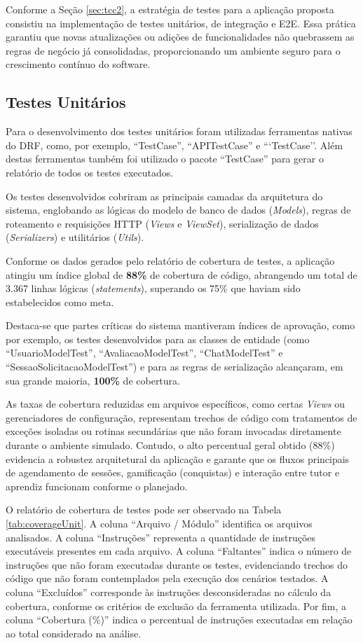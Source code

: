 Conforme a Seção \ref{sec:tcc2}, a estratégia de testes para a aplicação proposta consistiu na implementação de testes unitários, de integração e E2E. Essa prática garantiu que novas atualizações ou adições de funcionalidades não quebrassem as regras de negócio já consolidadas, proporcionando um ambiente seguro para o crescimento contínuo do software.

\subsection[Testes Unitários]{Testes Unitários}

Para o desenvolvimento dos testes unitários foram utilizadas ferramentas nativas do DRF, como, por exemplo, ``TestCase'', ``APITestCase'' e ```TestCase''. Além destas ferramentas também foi utilizado o pacote ``TestCase'' para gerar o relatório de todos os testes executados.

Os testes desenvolvidos cobriram as principais camadas da arquitetura do sistema, englobando as lógicas do modelo de banco de dados (\textit{Models}), regras de roteamento e requisições HTTP (\textit{Views} e \textit{ViewSet}), serialização de dados (\textit{Serializers}) e utilitários (\textit{Utils}).

Conforme os dados gerados pelo relatório de cobertura de testes, a aplicação atingiu um índice global de \textbf{88\%} de cobertura de código, abrangendo um total de 3.367 linhas lógicas (\textit{statements}), superando os 75\% que haviam sido estabelecidos como meta.

Destaca-se que partes críticas do sistema mantiveram índices de aprovação, como por exemplo, os testes desenvolvidos para as classes de entidade (como ``UsuarioModelTest'', ``AvaliacaoModelTest'', ``ChatModelTest'' e ``SessaoSolicitacaoModelTest'') e para as regras de serialização alcançaram, em sua grande maioria, \textbf{100\%} de cobertura.

As taxas de cobertura reduzidas em arquivos específicos, como certas \textit{Views} ou gerenciadores de configuração, representam trechos de código com tratamentos de exceções isoladas ou rotinas secundárias que não foram invocadas diretamente durante o ambiente simulado. Contudo, o alto percentual geral obtido (88\%) evidencia a robustez arquitetural da aplicação e garante que os fluxos principais de agendamento de sessões, gamificação (conquistas) e interação entre tutor e aprendiz funcionam conforme o planejado.

O relatório de cobertura de testes pode ser observado na Tabela \ref{tab:coverageUnit}. A coluna ``Arquivo / Módulo'' identifica os arquivos analisados. A coluna ``Instruções'' representa a quantidade de instruções executáveis presentes em cada arquivo. A coluna ``Faltantes'' indica o número de instruções que não foram executadas durante os testes, evidenciando trechos do código que não foram contemplados pela execução dos cenários testados.  A coluna ``Excluídos'' corresponde às instruções desconsideradas no cálculo da cobertura, conforme os critérios de exclusão da ferramenta utilizada. Por fim, a coluna ``Cobertura (\%)'' indica o percentual de instruções executadas em relação ao total considerado na análise.

